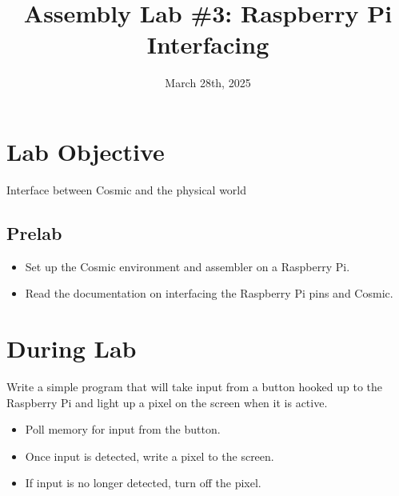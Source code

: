 \documentclass[
	12pt, %
]{fphw}
\title{Assembly Lab \#3: Raspberry Pi Interfacing} %
\date{March 28th, 2025} %
\institute{Elizabethtown College \\ Department of Computer Science} %
\begin{document}
\maketitle %


\section*{Lab Objective}

\begin{problem}
	Interface between Cosmic and the physical world 
\end{problem}


\subsection*{Prelab}

\begin{itemize}
  \item Set up the Cosmic environment and assembler on a Raspberry Pi.
  \item Read the documentation on interfacing the Raspberry Pi pins and Cosmic.
\end{itemize}


\section*{During Lab}

\begin{problem}
	Write a simple program that will take input from a button hooked up to the Raspberry Pi and light up a pixel on the screen when it is active.
\end{problem}


\begin{itemize}
  \item Poll memory for input from the button.
  \item Once input is detected, write a pixel to the screen.
  \item If input is no longer detected, turn off the pixel.
\end{itemize}
\end{document}
